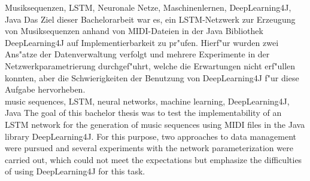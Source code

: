 \documentclass[draft=false
              ,paper=a4
              ,twoside=false
              ,fontsize=11pt
              ,headsepline
              ,BCOR10mm
              ,DIV11
              ]{scrbook}
\begin{document}


\frontmatter

\maketitle

\onehalfspacing

\HAWAbstractPage
{Musiksequenzen, LSTM, Neuronale Netze, Maschinenlernen, DeepLearning4J, Java}%
{Das Ziel dieser Bachelorarbeit war es, ein LSTM-Netzwerk zur Erzeugung von Musiksequenzen anhand von MIDI-Dateien in der Java Bibliothek DeepLearning4J auf Implementierbarkeit zu pr"ufen. Hierf"ur wurden zwei Ans"atze der Datenverwaltung verfolgt und mehrere Experimente in der Netzwerkparametrierung durchgef"uhrt, welche die Erwartungen nicht erf"ullen konnten, aber die Schwierigkeiten der Benutzung von DeepLearning4J f"ur diese Aufgabe hervorheben.\\}
{music sequences, LSTM, neural networks, machine learning, DeepLearning4J, Java}%
{The goal of this bachelor thesis was to test the implementability of an LSTM network for the generation of music sequences using MIDI files in the Java library DeepLearning4J. For this purpose, two approaches to data management were pursued and several experiments with the network parameterization were carried out, which could not meet the expectations but emphasize the difficulties of using DeepLearning4J for this task.}

\newpage
\singlespacing

\tableofcontents
\newpage
\listoftables
\listoffigures
\renewcommand\lstlistlistingname{Quellcodeverzeichnis}
\lstlistoflistings
\renewcommand{\lstlistingname}{Quellcode}
\end{document}
